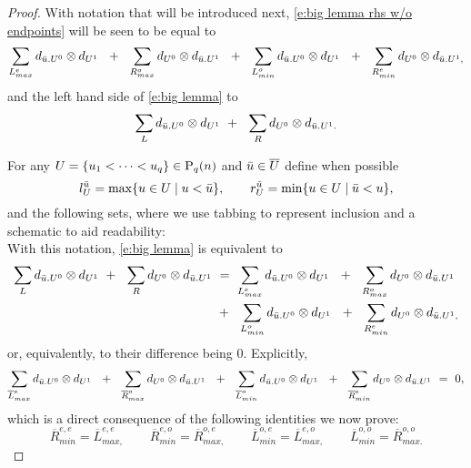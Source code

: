 \begin{proof}
	With notation that will be introduced next, \eqref{e:big lemma rhs w/o endpoints} will be seen to be equal to
	\begin{equation*}
	\sum_{{L}_{max}^{e}} d_{\bu.U^0} \otimes d_{U^1}\ \ +\ \
	\sum_{{R}_{max}^{o}} d_{U^0} \otimes d_{\bu.U^1}\ \ +\ \
	\sum_{{L}_{min}^{o}} d_{\bu.U^0} \otimes d_{U^1}\ \ +\ \
	\sum_{{R}_{min}^{e}} d_{U^0} \otimes d_{\bu.U^1,}
	\end{equation*}
	and the left hand side of \eqref{e:big lemma} to
	\begin{equation*}
	\sum_{L} d_{\bu.U^0} \otimes d_{U^1}\ +\ \
	\sum_{R} d_{U^0} \otimes d_{\bu.U^1.}
	\end{equation*}

	For any $U = \{u_1 < \cdots < u_q\} \in \P_{q}(n)$ and $\bu \in \overline{U}$ define when possible
	\begin{equation*}
	l_U^\bu = \max \{u \in U \mid u < \bu\}, \qquad
	r_U^\bu = \min\{u \in U \mid \bu < u\},
	\end{equation*}
	and the following sets, where we use tabbing to represent inclusion and a schematic to aid readability:\\

	

	With this notation, \eqref{e:big lemma} is equivalent to
	\begin{align*}
	\sum_{L} d_{\bu.U^0} \otimes d_{U^1}\ +\ \
	\sum_{R} d_{U^0} \otimes d_{\bu.U^1} \ & = \
	\sum_{{L}_{max}^{e}} d_{\bu.U^0} \otimes d_{U^1}\ \ +\ \
	\sum_{{R}_{max}^{o}} d_{U^0} \otimes d_{\bu.U^1}\ \\ \ & +\ \
	\sum_{{L}_{min}^{o}} d_{\bu.U^0} \otimes d_{U^1}\ \ +\ \
	\sum_{{R}_{min}^{e}} d_{U^0} \otimes d_{\bu.U^1,}
	\end{align*}
	or, equivalently, to their difference being $0$.
	Explicitly,
	\begin{equation*}
	\sum_{\overline{L}_{max}^{e}} d_{\bu.U^0} \otimes d_{U^1}\ \ +\ \
	\sum_{\overline{R}_{max}^{o}} d_{U^0} \otimes d_{\bu.U^1}\ \ +\ \
	\sum_{\overline{L}_{min}^{o}} d_{\bu.U^0} \otimes d_{U^1}\ \ +\ \
	\sum_{\overline{R}_{min}^{e}} d_{U^0} \otimes d_{\bu.U^1} \ = \ 0,
	\end{equation*}
	which is a direct consequence of the following identities we now prove:
	\begin{equation} \label{e:big lemma four identities}
	\overline{R}_{min}^{e,e} = \overline{L}_{max,}^{e,e} \qquad
	\overline{R}_{min}^{e,o} = \overline{R}_{max,}^{o,e} \qquad
	\overline{L}_{min}^{o,e} = \overline{L}_{max,}^{e,o} \qquad
	\overline{L}_{min}^{o,o} = \overline{R}_{max.}^{o,o}
	\end{equation}


\end{proof}
